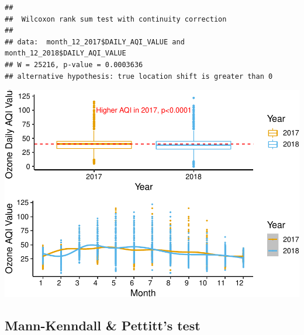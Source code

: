 \documentclass[12pt,]{article}
\newenvironment{Shaded}{\begin{snugshade}}{\end{snugshade}}
\newcommand{\KeywordTok}[1]{\textcolor[rgb]{0.13,0.29,0.53}{\textbf{#1}}}
\newcommand{\DataTypeTok}[1]{\textcolor[rgb]{0.13,0.29,0.53}{#1}}
\newcommand{\DecValTok}[1]{\textcolor[rgb]{0.00,0.00,0.81}{#1}}
\newcommand{\StringTok}[1]{\textcolor[rgb]{0.31,0.60,0.02}{#1}}
\newcommand{\OperatorTok}[1]{\textcolor[rgb]{0.81,0.36,0.00}{\textbf{#1}}}
\newcommand{\NormalTok}[1]{#1}
\begin{document}
\begin{Shaded}
\end{Shaded}

\begin{verbatim}
## 
##  Wilcoxon rank sum test with continuity correction
## 
## data:  month_12_2017$DAILY_AQI_VALUE and month_12_2018$DAILY_AQI_VALUE
## W = 25216, p-value = 0.0003636
## alternative hypothesis: true location shift is greater than 0
\end{verbatim}

\includegraphics{Xia_ENV_872_Project_files/figure-latex/Final visualization 1-1.pdf}
\pagebreak

\subsection{Mann-Kenndall \& Pettitt's
test}\label{mann-kenndall-pettitts-test}
\end{document}
